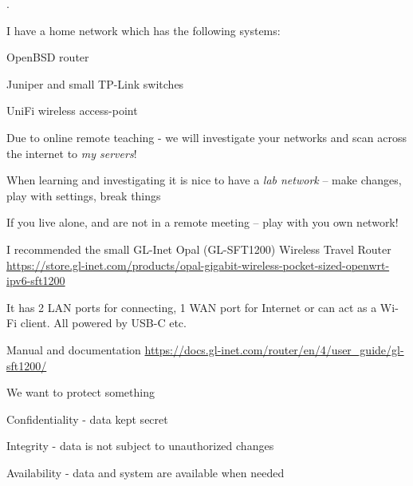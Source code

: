 \documentclass[Screen16to9,17pt]{foils}
\begin{document}
.

\begin{list1}
\item I have a home network which has the following systems:
\begin{list2}
\item OpenBSD router
\item Juniper and small TP-Link switches
\item UniFi wireless access-point
\end{list2}
\end{list1}

Due to online remote teaching - we will investigate your networks and scan across the internet to \emph{my servers}!



\begin{list2}
\item When learning and investigating it is nice to have a \emph{lab network} -- make changes, play with settings, break things
\item If you live alone, and are not in a remote meeting -- play with you own network!
\item I recommended the small GL-Inet Opal (GL-SFT1200) Wireless Travel Router\\
\url{https://store.gl-inet.com/products/opal-gigabit-wireless-pocket-sized-openwrt-ipv6-sft1200}
\item It has 2 LAN ports for connecting, 1 WAN port for Internet or can act as a Wi-Fi client. All powered by USB-C etc.
\item Manual and documentation \url{https://docs.gl-inet.com/router/en/4/user_guide/gl-sft1200/}
\end{list2}



\begin{list1}
\item We want to protect something
\item Confidentiality - data kept secret
\item Integrity - data is not subject to unauthorized changes
\item Availability - data and system are available when needed
\end{list1}
\end{document}
